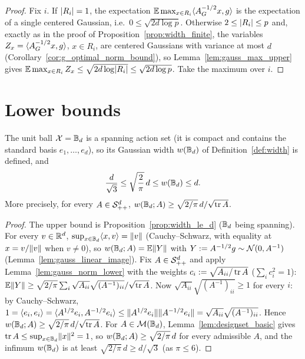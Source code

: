 \begin{proof}
\leanok
{}
Fix $i$. If $\lvert R_i \rvert = 1$, the expectation $\mathbb{E}\max_{x\in R_i}\langle A_G^{-1/2}x, g \rangle$ is the
expectation of a single centered Gaussian, i.e.\ $0 \le \sqrt{2d\log p}$. Otherwise
$2 \le \lvert R_i \rvert \le p$ and, exactly as in the proof of Proposition~\ref{prop:width_finite},
the variables $Z_x = \langle A_G^{-1/2}x, g \rangle$, $x \in R_i$, are centered Gaussians with variance
at most $d$ (Corollary~\ref{cor:g_optimal_norm_bound}), so Lemma~\ref{lem:gauss_max_upper}
gives $\mathbb{E}\max_{x\in R_i}Z_x \le \sqrt{2d\log\lvert R_i \rvert} \le \sqrt{2d\log p}$. Take the
maximum over $i$.
\end{proof}

\section{Lower bounds}
\label{sec:width_lower}

\begin{proposition}\label{prop:width_ball}
\leanok
{}
The unit ball $\mathcal{X} = \mathbb{B}_d$ is a spanning action set (it is compact and contains the
standard basis $e_1,\dots,e_d$), so its Gaussian width $w(\mathbb{B}_d)$ of
Definition~\ref{def:width} is defined, and
\[
  \frac{d}{\sqrt 3} \le \sqrt{\frac{2}{\pi}}\,d \le w(\mathbb{B}_d) \le d .
\]
More precisely, for every $A \in \mathcal{S}_{++}^{d}$, $w(\mathbb{B}_d;A) \ge \sqrt{2/\pi}\,d/\sqrt{\operatorname{tr} A}$.
\end{proposition}

\begin{proof}
\leanok
{}
The upper bound is Proposition~\ref{prop:width_le_d} ($\mathbb{B}_d$ being spanning). For every
$v \in \mathbb{R}^d$, $\sup_{x\in\mathbb{B}_d}\langle x, v \rangle = \lVert v \rVert$ (Cauchy--Schwarz, with equality at
$x = v/\lVert v \rVert$ when $v \ne 0$), so $w(\mathbb{B}_d;A) = \mathbb{E}\lVert Y \rVert$ with
$Y := A^{-1/2}g \sim \mathcal{N}(0, A^{-1})$ (Lemma~\ref{lem:gauss_linear_image}). Fix $A \in \mathcal{S}_{++}^{d}$
and apply Lemma~\ref{lem:gauss_norm_lower} with the weights $c_i := \sqrt{A_{ii}/\operatorname{tr} A}$
($\sum_i c_i^2 = 1$):
$\mathbb{E}\lVert Y \rVert \ge \sqrt{2/\pi}\sum_i \sqrt{A_{ii}}\sqrt{(A^{-1})_{ii}}/\sqrt{\operatorname{tr} A}$. Now
$\sqrt{A_{ii}}\sqrt{(A^{-1})_{ii}} \ge 1$ for every $i$: by Cauchy--Schwarz,
$1 = \langle e_i, e_i \rangle = \langle A^{1/2}e_i, A^{-1/2}e_i \rangle \le \lVert A^{1/2}e_i \rVert\lVert A^{-1/2}e_i \rVert
= \sqrt{A_{ii}}\sqrt{(A^{-1})_{ii}}$. Hence
$w(\mathbb{B}_d;A) \ge \sqrt{2/\pi}\,d/\sqrt{\operatorname{tr} A}$. For $A \in \mathcal{M}(\mathbb{B}_d)$,
Lemma~\ref{lem:designset_basic} gives $\operatorname{tr} A \le \sup_{x\in\mathbb{B}_d}\lVert x \rVert^2 = 1$, so
$w(\mathbb{B}_d;A) \ge \sqrt{2/\pi}\,d$ for every admissible $A$, and the infimum
$w(\mathbb{B}_d)$ is at least $\sqrt{2/\pi}\,d \ge d/\sqrt 3$ (as $\pi \le 6$).
\end{proof}

